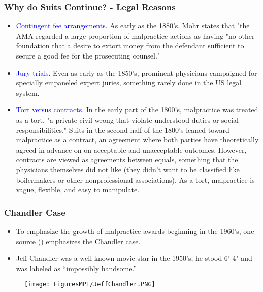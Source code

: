 \documentclass[serif,10pt]{beamer}
\begin{document}
\begin{frame}
\frametitle{Why do Suits Continue? - Legal Reasons}
  \begin{itemize}
\item \textcolor{blue}{Contingent fee arrangements}. As early as the 1880's, Mohr states that "the AMA regarded a large proportion of malpractice actions as having "no other foundation that a desire to extort money from the defendant sufficient to secure a good fee for the prosecuting counsel."
\item \textcolor{blue}{Jury trials}. Even as early as the 1850's, prominent physicians campaigned for specially empaneled expert juries, something rarely done in the US legal system.
\item \textcolor{blue}{Tort versus contracts}. {\small {In the early part of the 1800's, malpractice was treated as a tort, "a private civil wrong that violate understood duties or social responsibilities." Suits in the second half of the 1800's leaned toward malpractice as a contract, an agreement where both parties have theoretically agreed in advance on on acceptable and unacceptable outcomes. However, contracts are viewed as agreements between equals, something that the physicians themselves did not like (they didn't want to be classified like boilermakers or other nonprofessional associations). As a tort, malpractice is vague, flexible, and easy to manipulate.}}
\end{itemize}
\end{frame}

\begin{frame}
\frametitle{ Chandler Case}
  \begin{itemize}
\item To emphasize the growth of malpractice awards beginning in the 1960's, one source (\cite{yang2016lumbar}) emphasizes the Chandler case.
\item Jeff Chandler was a well-known movie star in the 1950's, he stood 6' 4" and was labeled as ``impossibly handsome.''
\end{itemize}
\begin{figure}[htp]
\begin{center}
    \texttt{[image: FiguresMPL/JeffChandler.PNG]}
    \end{center}
\end{figure}
\end{frame}
\end{document}
